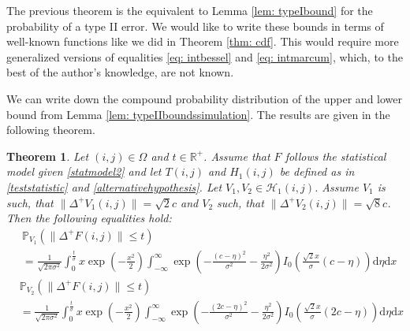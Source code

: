 \documentclass[a4paper,12pt]{article}
\newcommand{\norm}[1]{\lVert#1\rVert}
\theoremstyle{plain}
\newtheorem{theorem}{Theorem}[section]
\theoremstyle{definition}
\numberwithin{equation}{section}
\begin{document}
The previous theorem is the equivalent to Lemma \ref{lem: typeIbound} for the probability of a type II error. We would like to write these bounds in terms of well-known functions like we did in Theorem \ref{thm: cdf}. This would require more generalized versions of equalities \eqref{eq: intbessel} and \eqref{eq: intmarcum}, which, to the best of the author's knowledge, are not known.

We can write down the compound probability distribution of the upper and lower bound from Lemma \ref{lem: typeIIboundssimulation}. The results are given in the following theorem.

\begin{theorem}\label{thm: typeIIboundsintegration}
	Let $(i, j) \in \Omega$ and $t \in \mathbb{R}^+$. Assume that $F$ follows the statistical model given \eqref{statmodel2} and let $T(i, j)$ and $H_1(i, j)$ be defined as in \eqref{teststatistic} and \eqref{alternativehypothesis}. Let $V_1, V_2 \in \mathcal{H}_1(i, j)$. Assume $V_1$ is such, that $\norm{\Delta^+ V_1(i, j)} = \sqrt{2} c$ and $V_2$ such, that $\norm{\Delta^+ V_2(i, j)} = \sqrt{8} c$. Then the following equalities hold:
	\begin{equation}\label{eq: typeIIupperboundintegration}
		\begin{aligned}
			&\mathbb{P}_{V_1}\left( \norm{\Delta^+ F(i, j)} \leq t \right) \\
			&= \frac{1}{\sqrt{2 \pi \sigma^2}} \int_0^\frac{t}{\sigma} x \exp \left( - \frac{x^2}{2} \right) \int_{-\infty}^\infty \exp \left( - \frac{(c - \eta)^2}{\sigma^2} - \frac{\eta^2}{2 \sigma^2} \right) I_0 \left( \frac{\sqrt{2} x}{\sigma} (c - \eta) \right) \mathrm{d}\eta \mathrm{d}x
		\end{aligned}
	\end{equation}
	\begin{equation}\label{eq: typeIIlowerboundintegration}
		\begin{aligned}
			&\mathbb{P}_{V_2}\left( \norm{\Delta^+ F(i, j)} \leq t \right) \\
			&= \frac{1}{\sqrt{2 \pi \sigma^2}} \int_0^\frac{t}{\sigma} x \exp \left( - \frac{x^2}{2} \right) \int_{-\infty}^\infty \exp \left( - \frac{(2 c - \eta)^2}{\sigma^2} - \frac{\eta^2}{2 \sigma^2} \right) I_0 \left( \frac{\sqrt{2} x}{\sigma} (2 c - \eta) \right) \mathrm{d}\eta \mathrm{d}x
		\end{aligned}
	\end{equation}
\end{theorem}
\end{document}
